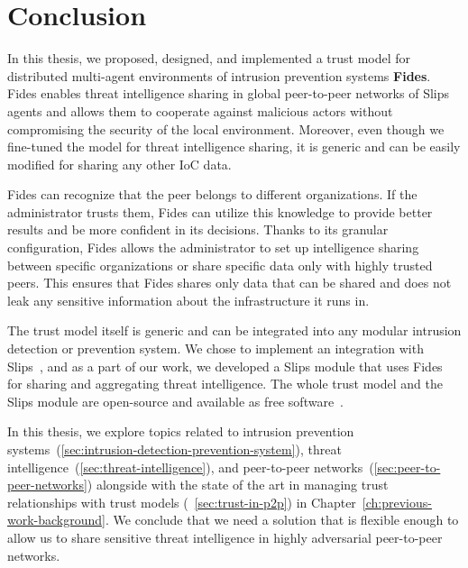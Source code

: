 \chapter{Conclusion}
\label{ch:conclusion}

In this thesis, we proposed, designed, and implemented a trust model for distributed multi-agent environments of intrusion prevention systems \textbf{Fides}.
Fides enables threat intelligence sharing in global peer-to-peer networks of Slips agents and allows them to cooperate against malicious actors without compromising the security of the local environment. 
Moreover, even though we fine-tuned the model for threat intelligence sharing, it is generic and can be easily modified for sharing any other IoC data.

Fides can recognize that the peer belongs to different organizations. If the administrator trusts them, Fides can utilize this knowledge to provide better results and be more confident in its decisions.
Thanks to its granular configuration, Fides allows the administrator to set up intelligence sharing between specific organizations or share specific data only with highly trusted peers.
This ensures that Fides shares only data that can be shared and does not leak any sensitive information about the infrastructure it runs in.

The trust model itself is generic and can be integrated into any modular intrusion detection or prevention system. We chose to implement an integration with Slips~\cite{slips}, and as a part of our work, we developed a Slips module that uses Fides for sharing and aggregating threat intelligence.
The whole trust model and the Slips module are open-source and available as free software~\cite{fidesGithub}.

In this thesis, we explore topics related to intrusion prevention systems~(\ref{sec:intrusion-detection-prevention-system}), threat intelligence~(\ref{sec:threat-intelligence}), and peer-to-peer networks~(\ref{sec:peer-to-peer-networks}) alongside with the state of the art in managing trust relationships with trust models (~\ref{sec:trust-in-p2p}) in Chapter~\ref{ch:previous-work-background}.
We conclude that we need a solution that is flexible enough to allow us to share sensitive threat intelligence in highly adversarial peer-to-peer networks.

